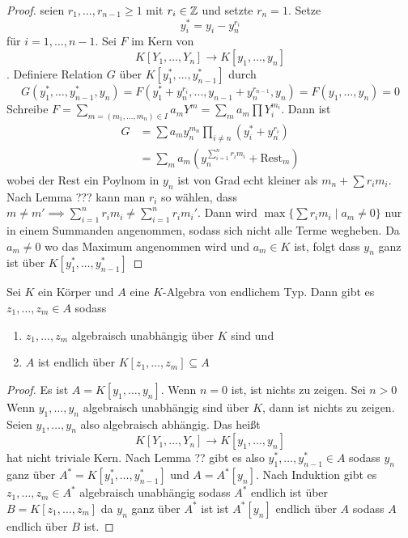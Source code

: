 \begin{proof}
    seien $r_1,\dots,r_{n-1}\geq 1$ mit $r_i\in\mathbb{Z}$ und setzte $r_n=1$. Setze $$y_i^*=y_i-y_n^{r_i}$$ für $i=1,\dots,n-1$. Sei $F$ im Kern von 
    $$K[Y_1,\dots,Y_n]\to K[y_1,\dots,y_n]$$. Definiere Relation $G$ über $K[y_1^*,\dots,y_{n-1}^*]$ durch 
    $$G(y_1^*,\dots,y_{n-1}^*,y_n)=F(y_1^*+y_n^{r_i},\dots,y_{n-1}+y_n^{r_{n-1}},y_n)=F(y_1,\dots,y_n)=0$$
    Schreibe $F=\sum_{m=(m_1,\dots,m_n)\in I} a_mY^m=\sum_ma_m\prod Y_i^{m_i}$.
    Dann ist 
    \begin{align*}
        G&=\sum a_my_n^{m_n}\prod_{i\neq n}(y_i^*+y_n^{r_i})\\
        &=\sum_ma_m(y_n^{\sum_{i=1}^n r_im_i}+\text{Rest}_m)
    \end{align*} wobei der Rest ein Poylnom in $y_n$ ist von Grad echt kleiner als $m_n+\sum r_im_i$.
    Nach Lemma ??? kann man $r_i$ so wählen, dass $m\neq m'\implies \sum_{i=1}^nr_im_i\neq \sum_{i=1}^nr_im_i'$.
    Dann wird $\max\{\sum r_im_i\mid a_m\neq 0\}$ nur in einem Summanden angenommen, sodass sich nicht alle Terme wegheben.
    Da $a_m\neq 0$ wo das Maximum angenommen wird und $a_m\in K$ ist, folgt dass $y_n$ ganz ist über $K[y_1^*,\dots,y_{n-1}^*]$
\end{proof}
\begin{Satz}\label{Satz:NoetherNor}
Sei $K$ ein Körper und $A$ eine $K$-Algebra von endlichem Typ. Dann gibt es $z_1,\dots,z_m\in A$ sodass
\begin{enumerate}
    \item $z_1,\dots,z_m$ algebraisch unabhängig über $K$ sind und
    \item $A$ ist endlich über $K[z_1,\dots,z_m]\subseteq A$
\end{enumerate}
\end{Satz}
\begin{proof}
    Es ist $A=K[y_1,\dots,y_n]$. Wenn $n=0$ ist, ist nichts zu zeigen.
    Sei $n>0$ Wenn $y_1,\dots,y_n$ algebraisch unabhängig sind über $K$, dann ist nichts zu zeigen.
    Seien $y_1,\dots,y_n$ also algebraisch abhängig. Das heißt $$K[Y_1,\dots,Y_n]\to K[y_1,\dots,y_n]$$ hat nicht triviale Kern.
    Nach Lemma ?? gibt es also $y_1^*,\dots,y_{n-1}^*\in A$ sodass $y_n$ ganz über $A^*=K[y_1^*,\dots,y_{n-1}^*]$ und $A=A^*[y_n]$. Nach Induktion gibt es $z_1,\dots,z_m\in A^*$ algebraisch unabhängig sodass $A^*$ endlich ist über $B=K[z_1,\dots,z_m]$ da $y_n$ ganz über $A^*$ ist ist $A^*[y_n]$ endlich über $A$ sodass $A$ endlich über $B$ ist.
\end{proof}
